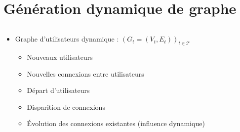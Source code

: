 \documentclass[c]{beamer}
\begin{document}
\section{Génération dynamique de graphe}
\begin{frame}
    \begin{columns}
        \begin{column}{.5\textwidth}
            \begin{itemize}
                \item Graphe d'utilisateurs dynamique :
                    $\left( G_t = (V_t, E_t) \right)_{t \in \mathcal{T}}$
                \begin{itemize}
                    \item<2-> Nouveaux utilisateurs
                    \item<3-> Nouvelles connexions entre utilisateurs
                    \item<4-> Départ d'utilisateurs
                    \item<5-> Disparition de connexions
                    \item<6-> Évolution des connexions existantes (influence dynamique)
                \end{itemize}
            \end{itemize}
        \end{column}
        \begin{column}{.5\textwidth}
\end{column}
\end{columns}
\end{frame}
\end{document}
